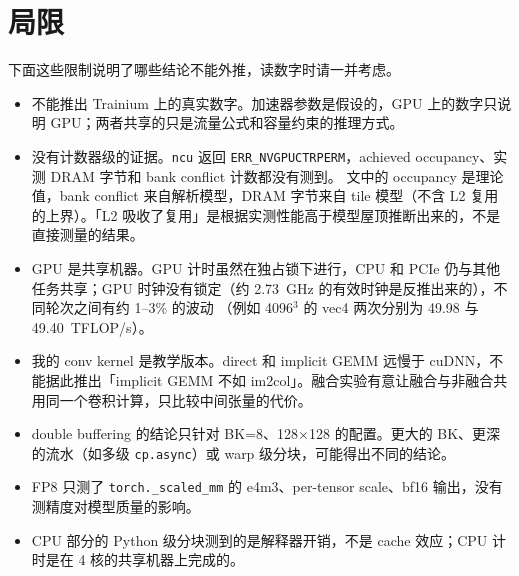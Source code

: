 \documentclass[11pt,a4paper]{ctexart}
\begin{document}
\section{局限}
下面这些限制说明了哪些结论不能外推，读数字时请一并考虑。
\begin{caveatbox}
\begin{itemize}
  \item 不能推出 Trainium 上的真实数字。加速器参数是假设的，GPU 上的数字只说明 GPU；两者共享的只是流量公式和容量约束的推理方式。
  \item 没有计数器级的证据。\texttt{ncu} 返回 \texttt{ERR\_NVGPUCTRPERM}，achieved occupancy、实测 DRAM 字节和 bank conflict 计数都没有测到。
        文中的 occupancy 是理论值，bank conflict 来自解析模型，DRAM 字节来自 tile 模型（不含 L2 复用的上界）。「L2 吸收了复用」是根据实测性能高于模型屋顶推断出来的，不是直接测量的结果。
  \item GPU 是共享机器。GPU 计时虽然在独占锁下进行，CPU 和 PCIe 仍与其他任务共享；GPU 时钟没有锁定（约 2.73~GHz 的有效时钟是反推出来的），不同轮次之间有约 1--3\% 的波动
        （例如 4096$^3$ 的 vec4 两次分别为 49.98 与 49.40~TFLOP/s）。
  \item 我的 conv kernel 是教学版本。direct 和 implicit GEMM 远慢于 cuDNN，不能据此推出「implicit GEMM 不如 im2col」。融合实验有意让融合与非融合共用同一个卷积计算，只比较中间张量的代价。
  \item double buffering 的结论只针对 BK=8、128$\times$128 的配置。更大的 BK、更深的流水（如多级 \texttt{cp.async}）或 warp 级分块，可能得出不同的结论。
  \item FP8 只测了 \texttt{torch.\_scaled\_mm} 的 e4m3、per-tensor scale、bf16 输出，没有测精度对模型质量的影响。
  \item CPU 部分的 Python 级分块测到的是解释器开销，不是 cache 效应；CPU 计时是在 4 核的共享机器上完成的。
\end{itemize}
\end{caveatbox}

\end{document}
